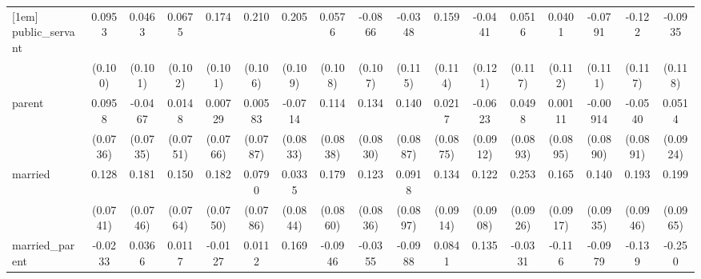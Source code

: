{\begin{tabular}{l*{16}{c}}
[1em]
public\_servant      &      0.0953         &      0.0463         &      0.0675         &       0.174         &       0.210\sym{*}  &       0.205         &      0.0576         &     -0.0866         &     -0.0348         &       0.159         &     -0.0441         &      0.0516         &      0.0401         &     -0.0791         &      -0.122         &     -0.0935         \\
                    &     (0.100)         &     (0.101)         &     (0.102)         &     (0.101)         &     (0.106)         &     (0.109)         &     (0.108)         &     (0.107)         &     (0.115)         &     (0.114)         &     (0.121)         &     (0.117)         &     (0.112)         &     (0.111)         &     (0.117)         &     (0.118)         \\
[1em]
parent              &      0.0958         &     -0.0467         &      0.0148         &     0.00729         &     0.00583         &     -0.0714         &       0.114         &       0.134         &       0.140         &      0.0217         &     -0.0623         &      0.0498         &     0.00111         &    -0.00914         &     -0.0540         &      0.0514         \\
                    &    (0.0736)         &    (0.0735)         &    (0.0751)         &    (0.0766)         &    (0.0787)         &    (0.0833)         &    (0.0838)         &    (0.0830)         &    (0.0887)         &    (0.0875)         &    (0.0912)         &    (0.0893)         &    (0.0895)         &    (0.0890)         &    (0.0891)         &    (0.0924)         \\
[1em]
married             &       0.128         &       0.181\sym{*}  &       0.150\sym{*}  &       0.182\sym{*}  &      0.0790         &      0.0335         &       0.179\sym{*}  &       0.123         &      0.0918         &       0.134         &       0.122         &       0.253\sym{**} &       0.165         &       0.140         &       0.193\sym{*}  &       0.199\sym{*}  \\
                    &    (0.0741)         &    (0.0746)         &    (0.0764)         &    (0.0750)         &    (0.0786)         &    (0.0844)         &    (0.0860)         &    (0.0836)         &    (0.0897)         &    (0.0914)         &    (0.0908)         &    (0.0926)         &    (0.0917)         &    (0.0935)         &    (0.0946)         &    (0.0965)         \\
[1em]
married\_parent      &     -0.0233         &      0.0366         &      0.0117         &     -0.0127         &      0.0112         &       0.169         &     -0.0946         &     -0.0355         &     -0.0988         &      0.0841         &       0.135         &     -0.0331         &      -0.116         &     -0.0979         &      -0.139         &      -0.250         \\

\end{tabular}}
